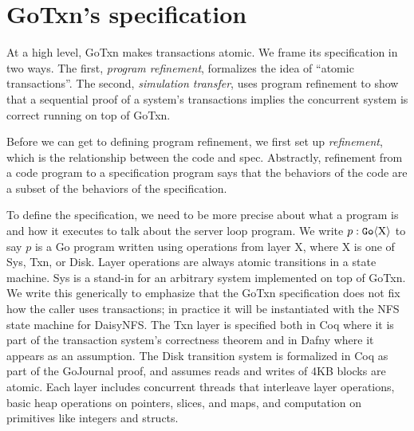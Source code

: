 \section{GoTxn's specification}%
\label{sec:gotxn:spec}


\resume

At a high level, GoTxn makes transactions atomic. We frame its specification in
two ways. The first, \emph{program refinement}, formalizes the idea of ``atomic
transactions''. The second, \emph{simulation transfer}, uses
program refinement to show that a sequential proof of a system's transactions
implies the concurrent system is correct running on top of GoTxn.

Before we can get to defining program refinement, we first set up
\emph{refinement}, which is the relationship between the code and spec.
Abstractly, refinement from a code program to
a specification program says that the behaviors of the code are a subset of the
behaviors of the specification.

To define the specification, we need to be more precise about what a program is
and how it executes to talk about the server loop program. We
write $p : \mathtt{Go}\langle \mathrm{X} \rangle$ to say $p$ is a Go program written using operations
from layer X, where X is one of Sys, Txn, or Disk.
Layer operations are always atomic transitions in a state machine. Sys is a
stand-in for an arbitrary system implemented on top of GoTxn. We write this
generically to emphasize that the GoTxn specification does not fix how the
caller uses transactions; in practice it will be instantiated with the NFS state
machine for DaisyNFS.
The Txn layer is specified both in Coq where it is part of the transaction
system's correctness theorem and in Dafny where it appears as an assumption. The
Disk transition system is formalized in Coq as part of the GoJournal proof,
and assumes reads and writes of 4KB blocks are atomic. Each layer
includes concurrent threads that interleave layer
operations, basic heap operations on pointers, slices, and maps, and computation
on primitives like integers and structs.

